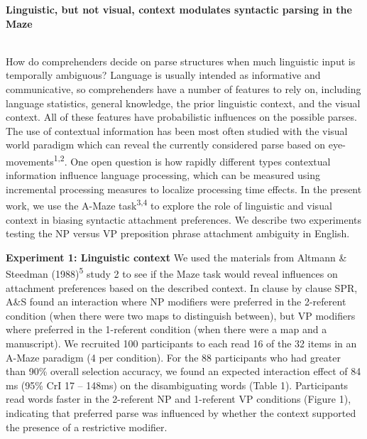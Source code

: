 \documentclass[11pt,a4paper]{article}
\renewcommand{\title}[1]{\textbf{#1}\\}
\newcommand{\authors}[1]{\iftoggle{anonymous}{\phantom{#1}}{#1}\\}
\begin{document}

\noindent\title{Linguistic, but not visual, context modulates syntactic parsing in the Maze}
\authors{Veronica Boyce (Stanford University, vboyce@stanford.edu), Roger P. Levy (MIT)} 
\newline

How do comprehenders  decide on parse structures when much linguistic input is temporally ambiguous?  Language is usually intended as informative and communicative, so comprehenders have a number of features to rely on, including language statistics, general knowledge, the prior linguistic context, and the visual context. All of these features have probabilistic influences on the possible parses. The use of contextual information has been most often studied with the visual world paradigm which can reveal the currently considered parse based on eye-movements\textsuperscript{1,2}. One open question is how rapidly different types contextual information influence language processing, which can be measured using incremental processing measures to localize processing time effects. In the present work, we use the A-Maze task\textsuperscript{3,4} to explore the role of linguistic and visual context in biasing syntactic attachment preferences. We describe two experiments testing the NP versus VP preposition phrase attachment ambiguity in English. 

\noindent\textbf{Experiment 1: Linguistic context} We used the materials from Altmann \& Steedman (1988)\textsuperscript{5} study 2
 to see if the Maze task would reveal influences on attachment preferences based on the described context. In clause by clause SPR, A\&S found an interaction where NP modifiers were preferred in the 2-referent condition (when there were two maps to distinguish between), but VP modifiers where preferred in the 1-referent condition (when there were a map and a manuscript). We recruited 100 participants to each read 16 of the 32 items in an A-Maze paradigm (4 per condition). For the 88 participants who had greater than 90\% overall selection accuracy, we found an expected interaction effect of 84 ms (95\% CrI 17 -- 148ms) on the disambiguating words (Table 1). Participants read words faster in the 2-referent NP and 1-referent VP conditions (Figure 1), indicating that preferred parse was influenced by whether the context supported the presence of a restrictive modifier. 
 
\end{document}
